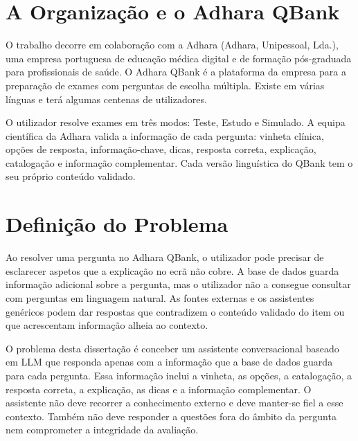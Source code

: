 \section{A Organização e o Adhara QBank}
\label{sec:chap1_org}

O trabalho decorre em colaboração com a Adhara (Adhara, Unipessoal, Lda.), uma empresa portuguesa de educação médica digital e de formação pós-graduada para profissionais de saúde. O Adhara QBank é a plataforma da empresa para a preparação de exames com perguntas de escolha múltipla. Existe em várias línguas e terá algumas centenas de utilizadores.

O utilizador resolve exames em três modos: Teste, Estudo e Simulado. A equipa científica da Adhara valida a informação de cada pergunta: vinheta clínica, opções de resposta, informação-chave, dicas, resposta correta, explicação, catalogação e informação complementar. Cada versão linguística do QBank tem o seu próprio conteúdo validado.

\section{Definição do Problema }
\label{sec:chap1_problem}

Ao resolver uma pergunta no Adhara QBank, o utilizador pode precisar de esclarecer aspetos que a explicação no ecrã não cobre. A base de dados guarda informação adicional sobre a pergunta, mas o utilizador não a consegue consultar com perguntas em linguagem natural. As fontes externas e os assistentes genéricos podem dar respostas que contradizem o conteúdo validado do item ou que acrescentam informação alheia ao contexto.

O problema desta dissertação é conceber um assistente conversacional baseado em \gls{LLM} que responda apenas com a informação que a base de dados guarda para cada pergunta. Essa informação inclui a vinheta, as opções, a catalogação, a resposta correta, a explicação, as dicas e a informação complementar. O assistente não deve recorrer a conhecimento externo e deve manter-se fiel a esse contexto. Também não deve responder a questões fora do âmbito da pergunta nem comprometer a integridade da avaliação.

